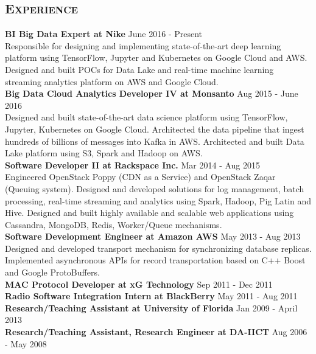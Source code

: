 \begin{resume}
\section{\textsc{Experience}}
\textbf{BI Big Data Expert at Nike} \hfill June 2016 - Present\\
Responsible for designing and implementing state-of-the-art deep learning platform using TensorFlow, Jupyter and Kubernetes on Google Cloud and AWS. Designed and built POCs for Data Lake and real-time machine learning streaming analytics platform on AWS and Google Cloud.\\
\textbf{Big Data Cloud Analytics Developer IV at Monsanto} \hfill Aug 2015 - June 2016\\
Designed and built state-of-the-art data science platform using TensorFlow, Jupyter, Kubernetes on Google Cloud. Architected the data pipeline that ingest hundreds of billions of messages into Kafka in AWS. Architected and built Data Lake platform using S3, Spark and Hadoop on AWS.\\
\textbf{Software Developer II at Rackspace Inc.} \hfill Mar 2014 - Aug 2015\\
Engineered OpenStack Poppy (CDN as a Service) and OpenStack Zaqar (Queuing system). Designed and developed solutions for log management, batch processing, real-time streaming and analytics using Spark, Hadoop, Pig Latin and Hive. Designed and built highly available and scalable web applications using Cassandra, MongoDB, Redis, Worker/Queue mechanisms.\\
\textbf{Software Development Engineer at Amazon AWS} \hfill May 2013 - Aug 2013\\
Designed and developed transport mechanism for synchronizing database replicas. Implemented asynchronous APIs for record transportation based on C++ Boost and Google ProtoBuffers.\\
\textbf{MAC Protocol Developer at xG Technology} \hfill Sep 2011 - Dec 2011\\
\textbf{Radio Software Integration Intern at BlackBerry} \hfill May 2011 - Aug 2011\\
\textbf{Research/Teaching Assistant at University of Florida} \hfill Jan 2009 - April 2013\\
\textbf{Research/Teaching Assistant, Research Engineer at DA-IICT} \hfill Aug 2006 - May 2008

\begin{formatb}
  \\
  \body\\
\end{formatb}


\end{resume}
